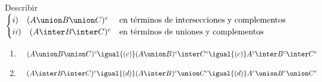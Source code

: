 \ejercicio
Describir
$
	\begin{cases}
		i) \quad (A \union B \union C)^c  & \text{en términos de intersecciones y complementos} \\
		ii) \quad (A \inter B \inter C)^c & \text{en términos de uniones y complementos}        \\
	\end{cases}
$
\begin{enumerate}[label=\roman*)]
	\item $\quad (A \union B \union C)^c \igual{(c)} (A \union B)^c \inter C^c \igual{(c)} A^c \inter B^c \inter C^c$
	\item $\quad (A \inter B \inter C)^c \igual{(d)} (A \inter B)^c \union C^c \igual{(d)} A^c \union B^c \union C^c$
\end{enumerate}
\\
